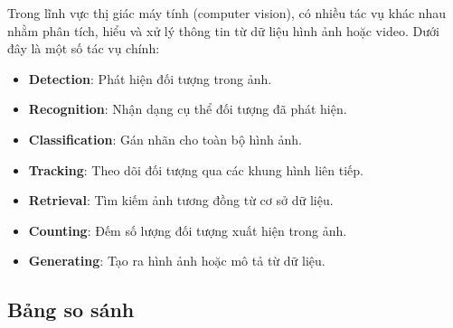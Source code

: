 \documentclass[12pt]{article}
\begin{document}
	Trong lĩnh vực thị giác máy tính (computer vision), có nhiều tác vụ khác nhau nhằm phân tích, hiểu và xử lý thông tin từ dữ liệu hình ảnh hoặc video. Dưới đây là một số tác vụ chính:
	
	\begin{itemize}
	\item \textbf{Detection}: Phát hiện đối tượng trong ảnh.
	\item \textbf{Recognition}: Nhận dạng cụ thể đối tượng đã phát hiện.
	\item \textbf{Classification}: Gán nhãn cho toàn bộ hình ảnh.
	\item \textbf{Tracking}: Theo dõi đối tượng qua các khung hình liên tiếp.
	\item \textbf{Retrieval}: Tìm kiếm ảnh tương đồng từ cơ sở dữ liệu.
	\item \textbf{Counting}: Đếm số lượng đối tượng xuất hiện trong ảnh.
	\item \textbf{Generating}: Tạo ra hình ảnh hoặc mô tả từ dữ liệu.
	\end{itemize}
	
	\subsection{Bảng so sánh}
	
	\renewcommand{\arraystretch}{1.4}
	\setlength{\tabcolsep}{4pt}
	
\end{document}

